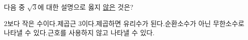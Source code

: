 다음 중 $\sqrt{3}$에 대한 설명으로 옳지 \underline{않은} 것은?
\begin{choicesv}{$2$보다 작은 수이다.}{제곱근 $3$이다.}{제곱하면 유리수가 된다.}{순환소수가 아닌 무한소수로 나타낼 수 있다.}{근호를 사용하지 않고 나타낼 수 있다.}\end{choicesv}
